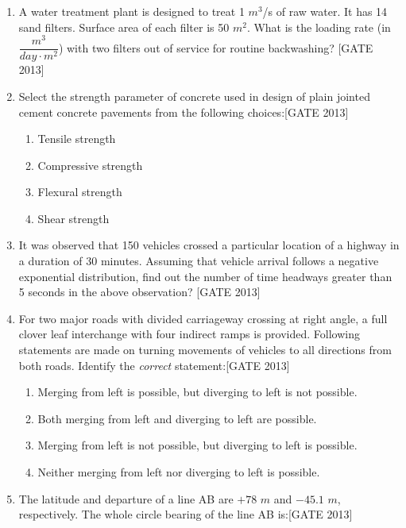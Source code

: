 \documentclass[journal,12pt,onecolumn]{IEEEtran}
\theoremstyle{remark}
\begin{document}
\begin{enumerate}
    \item A water treatment plant is designed to treat 1 $m^3$/s of raw water. It has 14 sand filters. Surface area of each filter is 50 $m^2$. What is the loading rate (in $\dfrac{m^3}{day \cdot m^2}$) with two filters out of service for routine backwashing? \underline{\hspace{2cm}}\hfill{[GATE 2013]}
\\
    \item Select the strength parameter of concrete used in design of plain jointed cement concrete pavements from the following choices:\hfill{[GATE 2013]}

    \begin{multicols}{2}
    \begin{enumerate}
        \item Tensile strength
        \item Compressive strength
        \item Flexural strength
        \item Shear strength
    \end{enumerate}
    \end{multicols}

    \item It was observed that 150 vehicles crossed a particular location of a highway in a duration of 30 minutes. Assuming that vehicle arrival follows a negative exponential distribution, find out the number of time headways greater than 5 seconds in the above observation? \underline{\hspace{2cm}}\hfill{[GATE 2013]}\\

    \item For two major roads with divided carriageway crossing at right angle, a full clover leaf interchange with four indirect ramps is provided. Following statements are made on turning movements of vehicles to all directions from both roads. Identify the \textit{correct} statement:\hfill{[GATE 2013]}
    
   
    \begin{enumerate}
        \item Merging from left is possible, but diverging to left is not possible.
        \item Both merging from left and diverging to left are possible.
        \item Merging from left is not possible, but diverging to left is possible.
        \item Neither merging from left nor diverging to left is possible.\\
    \end{enumerate} 
    \item The latitude and departure of a line AB are $+78$  $m$ and $-45.1$  $m$, respectively. The whole circle bearing of the line AB is:\hfill{[GATE 2013]}
    

\end{enumerate}
\end{document}
